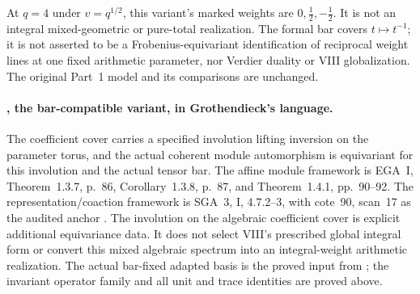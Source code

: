 At $q=4$ under $v=q^{1/2}$, this variant's marked
weights are $0,\tfrac12,-\tfrac12$.
It is not an integral mixed-geometric or pure-total
realization.
The formal bar covers $t\mapsto t^{-1}$; it is not
asserted to be a Frobenius-equivariant identification
of reciprocal weight lines at one fixed arithmetic
parameter, nor Verdier duality or VIII globalization.
The original Part~1 model and its comparisons are
unchanged.

\paragraph{, the bar-compatible variant, in Grothendieck's language.}
The coefficient cover carries a specified involution
lifting inversion on the parameter torus, and the actual
coherent module automorphism is equivariant for this
involution and the actual tensor bar.
The affine module framework is EGA~I, Theorem~1.3.7,
p.~86, Corollary~1.3.8, p.~87, and Theorem~1.4.1,
pp.~90--92.
The representation/coaction framework is SGA~3, I,
4.7.2--3, with cote~90, scan~17 as the audited anchor
\cite{EGA,SGA3,Archive}.
The involution on the algebraic coefficient cover is
explicit additional equivariance data.
It does not select VIII's prescribed global integral
form or convert this mixed algebraic spectrum into
an integral-weight arithmetic realization.
The actual bar-fixed adapted basis is the proved
input from ; the invariant operator family
and all unit and trace identities are proved above.

